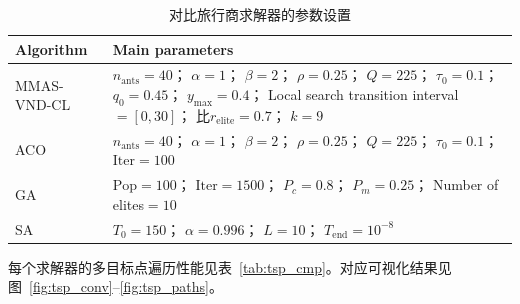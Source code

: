 \documentclass[lettersize,journal]{IEEEtran}
\begin{document}
\begin{table}[!t]
\caption{对比旅行商求解器的参数设置}
\label{tab:tsp_params}
\centering
\scriptsize
\begin{tabular}{p{}p{}}
\toprule
Algorithm & Main parameters \\
\midrule
MMAS-VND-CL & $n_{\mathrm{ants}}=40$；
$\alpha=1$；
$\beta=2$；\newline
$\rho=0.25$；
$Q=225$；
$\tau_0=0.1$；\newline
$q_0=0.45$；
$y_{\max}=0.4$；\newline
Local search transition interval$=[0,30]$；\newline
比$r_{\mathrm{elite}}=0.7$；
$k=9$ \\
\midrule
ACO & $n_{\mathrm{ants}}=40$；
$\alpha=1$；
$\beta=2$；
$\rho=0.25$；\newline
$Q=225$；
$\tau_0=0.1$；
$\mathrm{Iter}=100$ \\
\midrule
GA & $\mathrm{Pop}=100$；
$\mathrm{Iter}=1500$；\newline
$P_c=0.8$；
$P_m=0.25$；\newline
Number of elites$=10$ \\
\midrule
SA & $T_0=150$；
$\alpha=0.996$；\newline
$L=10$；
$T_{\mathrm{end}}=10^{-8}$ \\
\bottomrule
\end{tabular}
\end{table}

每个求解器的多目标点遍历性能见表~\textcolor{blue}{\ref{tab:tsp_cmp}}。对应可视化结果见图~\textcolor{blue}{\ref{fig:tsp_conv}}--\textcolor{blue}{\ref{fig:tsp_paths}}。
\end{document}
